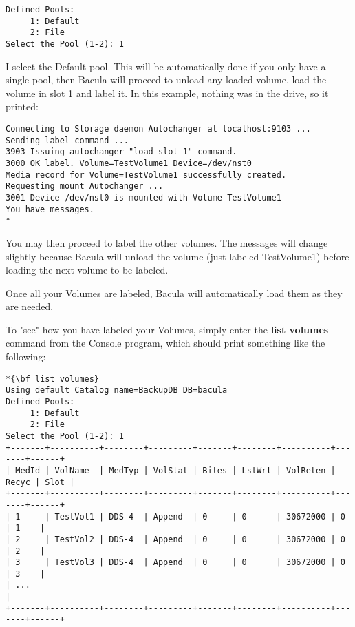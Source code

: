 \footnotesize
\begin{verbatim}
Defined Pools:
     1: Default
     2: File
Select the Pool (1-2): 1
\end{verbatim}
\normalsize

I select the Default pool. This will be automatically done if you only have a
single pool, then Bacula will proceed to unload any loaded volume, load the
volume in slot 1 and label it. In this example, nothing was in the drive, so
it printed: 

\footnotesize
\begin{verbatim}
Connecting to Storage daemon Autochanger at localhost:9103 ...
Sending label command ...
3903 Issuing autochanger "load slot 1" command.
3000 OK label. Volume=TestVolume1 Device=/dev/nst0
Media record for Volume=TestVolume1 successfully created.
Requesting mount Autochanger ...
3001 Device /dev/nst0 is mounted with Volume TestVolume1
You have messages.
*
\end{verbatim}
\normalsize

You may then proceed to label the other volumes. The messages will change
slightly because Bacula will unload the volume (just labeled TestVolume1)
before loading the next volume to be labeled. 

Once all your Volumes are labeled, Bacula will automatically load them as they
are needed. 

To "see" how you have labeled your Volumes, simply enter the {\bf list
volumes} command from the Console program, which should print something like
the following: 

\footnotesize
\begin{verbatim}
*{\bf list volumes}
Using default Catalog name=BackupDB DB=bacula
Defined Pools:
     1: Default
     2: File
Select the Pool (1-2): 1
+-------+----------+--------+---------+-------+--------+----------+-------+------+
| MedId | VolName  | MedTyp | VolStat | Bites | LstWrt | VolReten | Recyc | Slot |
+-------+----------+--------+---------+-------+--------+----------+-------+------+
| 1     | TestVol1 | DDS-4  | Append  | 0     | 0      | 30672000 | 0     | 1    |
| 2     | TestVol2 | DDS-4  | Append  | 0     | 0      | 30672000 | 0     | 2    |
| 3     | TestVol3 | DDS-4  | Append  | 0     | 0      | 30672000 | 0     | 3    |
| ...                                                                            |
+-------+----------+--------+---------+-------+--------+----------+-------+------+
\end{verbatim}
\normalsize

